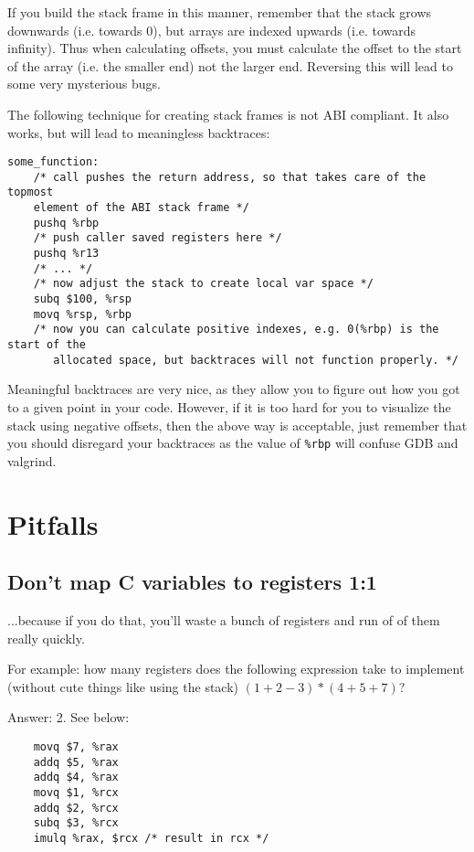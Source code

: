 \documentclass[11pt]{article}
\begin{document}
If you build the stack frame in this manner, remember that the stack grows downwards (i.e.
towards 0), but arrays are indexed upwards (i.e. towards infinity). Thus when calculating
offsets, you must calculate the offset to the start of the array (i.e. the smaller end)
not the larger end. Reversing this will lead to some very mysterious bugs.

The following technique for creating stack frames is not ABI compliant. It also works, but
will lead to meaningless backtraces:

\begin{lstlisting}
some_function:
    /* call pushes the return address, so that takes care of the topmost
    element of the ABI stack frame */
    pushq %rbp
    /* push caller saved registers here */
    pushq %r13
    /* ... */
    /* now adjust the stack to create local var space */
    subq $100, %rsp
    movq %rsp, %rbp
    /* now you can calculate positive indexes, e.g. 0(%rbp) is the start of the
       allocated space, but backtraces will not function properly. */
\end{lstlisting}

Meaningful backtraces are very nice, as they allow you to figure out how you got to a
given point in your code. However, if it is too hard for you to visualize the stack using
negative offsets, then the above way is acceptable, just remember that you should
disregard your backtraces as the value of \texttt{\%rbp} will confuse GDB and valgrind.

\section{Pitfalls}

\subsection{Don't map C variables to registers 1:1}

...because if you do that, you'll waste a bunch of registers and run of of them really
quickly.

For example: how many registers does the following expression take to implement (without
cute things like using the stack) $(1+2-3)*(4+5+7)$?

Answer: 2. See below:

\begin{lstlisting}
    movq $7, %rax
    addq $5, %rax
    addq $4, %rax
    movq $1, %rcx
    addq $2, %rcx
    subq $3, %rcx
    imulq %rax, $rcx /* result in rcx */
\end{lstlisting}
\end{document}
